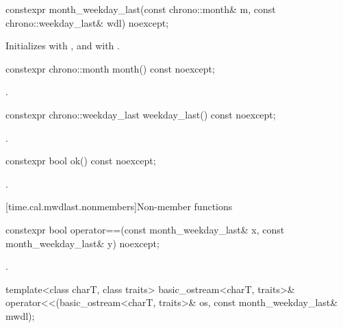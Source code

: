 %
\begin{itemdecl}
constexpr month_weekday_last(const chrono::month& m,
                             const chrono::weekday_last& wdl) noexcept;
\end{itemdecl}

\begin{itemdescr}
\pnum
\effects
Initializes  with , and  with .
\end{itemdescr}

%
\begin{itemdecl}
constexpr chrono::month month() const noexcept;
\end{itemdecl}

\begin{itemdescr}
\pnum
\returns
{}.
\end{itemdescr}

%
\begin{itemdecl}
constexpr chrono::weekday_last weekday_last() const noexcept;
\end{itemdecl}

\begin{itemdescr}
\pnum
\returns
{}.
\end{itemdescr}

%
\begin{itemdecl}
constexpr bool ok() const noexcept;
\end{itemdecl}

\begin{itemdescr}
\pnum
\returns
{}.
\end{itemdescr}

[time.cal.mwdlast.nonmembers]{Non-member functions}

%
\begin{itemdecl}
constexpr bool operator==(const month_weekday_last& x, const month_weekday_last& y) noexcept;
\end{itemdecl}

\begin{itemdescr}
\pnum
\returns
{}.
\end{itemdescr}

%
\begin{itemdecl}
template<class charT, class traits>
  basic_ostream<charT, traits>&
    operator<<(basic_ostream<charT, traits>& os, const month_weekday_last& mwdl);
\end{itemdecl}

